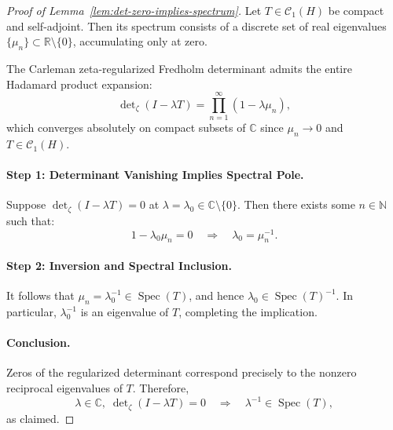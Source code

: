 \begin{proof}[Proof of Lemma~\ref{lem:det-zero-implies-spectrum}]
Let \( T \in \mathcal{C}_1(H) \) be compact and self-adjoint. Then its spectrum consists of a discrete set of real eigenvalues \( \{ \mu_n \} \subset \mathbb{R} \setminus \{0\} \), accumulating only at zero.

The Carleman zeta-regularized Fredholm determinant admits the entire Hadamard product expansion:
\[
\det\nolimits_{\zeta}(I - \lambda T) = \prod_{n=1}^\infty (1 - \lambda \mu_n),
\]
which converges absolutely on compact subsets of \( \mathbb{C} \) since \( \mu_n \to 0 \) and \( T \in \mathcal{C}_1(H) \).

\paragraph{Step 1: Determinant Vanishing Implies Spectral Pole.}
Suppose \( \det\nolimits_{\zeta}(I - \lambda T) = 0 \) at \( \lambda = \lambda_0 \in \mathbb{C} \setminus \{0\} \). Then there exists some \( n \in \mathbb{N} \) such that:
\[
1 - \lambda_0 \mu_n = 0 \quad \Longrightarrow \quad \lambda_0 = \mu_n^{-1}.
\]

\paragraph{Step 2: Inversion and Spectral Inclusion.}
It follows that \( \mu_n = \lambda_0^{-1} \in \operatorname{Spec}(T) \), and hence \( \lambda_0 \in \operatorname{Spec}(T)^{-1} \). In particular, \( \lambda_0^{-1} \) is an eigenvalue of \( T \), completing the implication.

\paragraph{Conclusion.}
Zeros of the regularized determinant correspond precisely to the nonzero reciprocal eigenvalues of \( T \). Therefore,
\[
\lambda \in \mathbb{C}, \; \det\nolimits_{\zeta}(I - \lambda T) = 0 \quad \Longrightarrow \quad \lambda^{-1} \in \operatorname{Spec}(T),
\]
as claimed.
\end{proof}
